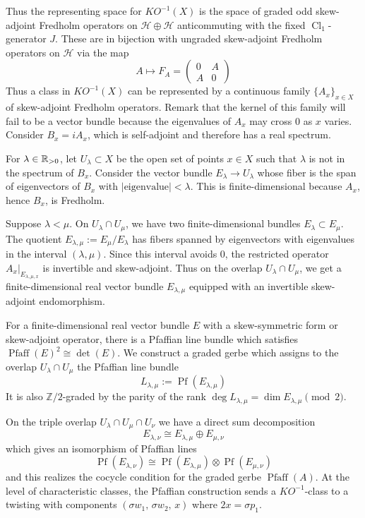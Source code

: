 \documentclass[12pt]{article}
\begin{document}
Thus the representing space for $KO^{-1}(X)$ is the space of graded odd skew-adjoint Fredholm operators on $\mathcal H \oplus \mathcal H$ anticommuting with the fixed $\operatorname{Cl}_1$-generator $J$. These are in bijection with ungraded skew-adjoint Fredholm operators on $\mathcal H$ via the map \[A
    \longmapsto
    F_A=
    \begin{pmatrix}
        0 & A \\
        A & 0
    \end{pmatrix}\]
Thus a class in $KO^{-1}(X)$ can be represented by a continuous family $\{A_x\}_{x\in X}$ of skew-adjoint Fredholm operators. Remark that the kernel of this family will fail to be a vector bundle because the eigenvalues of $A_x$ may cross $0$ as $x$ varies. Consider $B_x = i A_x$, which is self-adjoint and therefore has a real spectrum.

For $\lambda\in \mathbb{R}_{>0}$, let $U_\lambda \subset X$ be the open set of points $x\in X$ such that $\lambda$ is not in the spectrum of $B_x$. Consider the vector bundle $E_\lambda\to U_\lambda$ whose fiber is the span of eigenvectors of $B_x$ with
$|\text{eigenvalue}|<\lambda$. This is finite-dimensional because $A_x$, hence $B_x$, is Fredholm.

Suppose $\lambda<\mu$. On $U_\lambda\cap U_\mu$, we have two finite-dimensional bundles $E_\lambda\subset E_\mu$. The quotient $E_{\lambda,\mu}:=E_\mu/E_\lambda$ has fibers spanned by eigenvectors with eigenvalues in the interval $(\lambda,\mu)$. Since this interval avoids $0$, the restricted operator $A_x|_{E_{\lambda,\mu,x}}$ is invertible and skew-adjoint. Thus on the overlap $U_\lambda\cap U_\mu$, we get a finite-dimensional real vector bundle $E_{\lambda,\mu}$ equipped with an invertible skew-adjoint endomorphism.


For a finite-dimensional real vector bundle $E$ with a skew-symmetric form or skew-adjoint operator, there is a Pfaffian line bundle which satisfies $\operatorname{Pfaff}(E)^2\cong \det(E)$. We construct a graded gerbe which assigns to the overlap $U_\lambda\cap U_\mu$ the Pfaffian line bundle
\[
    L_{\lambda,\mu}
    :=
    \operatorname{Pf}(E_{\lambda,\mu})
\] It is also $\mathbb Z/2$-graded by the parity of the rank $\deg L_{\lambda,\mu} = \dim E_{\lambda,\mu}\pmod 2$.

On the triple overlap
$U_\lambda\cap U_\mu\cap U_\nu$
we have a direct sum decomposition
\[E_{\lambda,\nu}
    \cong
    E_{\lambda,\mu}\oplus E_{\mu,\nu}\]
which gives an isomorphism of Pfaffian lines
\[
    \operatorname{Pf}(E_{\lambda,\nu})
    \cong
    \operatorname{Pf}(E_{\lambda,\mu})
    \otimes
    \operatorname{Pf}(E_{\mu,\nu})\]
and this realizes the cocycle condition for the graded gerbe $\operatorname{Pfaff}(A)$. At the level of characteristic classes, the Pfaffian construction sends a $KO^{-1}$-class to a twisting with components $(\sigma w_1,\, \sigma w_2,\, x)$
where $2x=\sigma p_1$.
\end{document}
